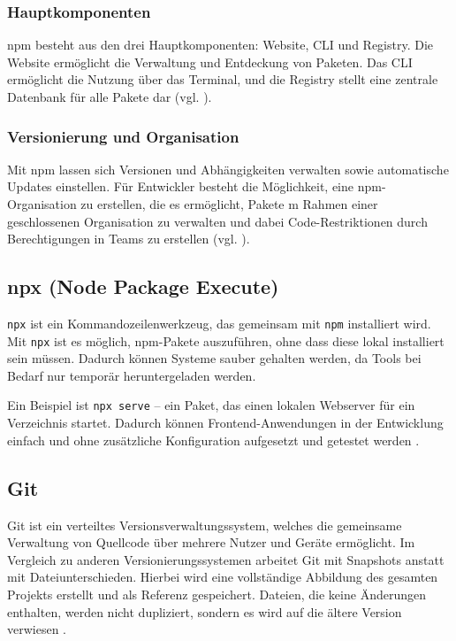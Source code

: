 \documentclass[oneside]{ausarbeitung}
\begin{document}
\subsubsection{Hauptkomponenten}
npm besteht aus den drei Hauptkomponenten: Website, CLI und Registry. Die Website ermöglicht die Verwaltung und Entdeckung von Paketen. Das CLI ermöglicht die Nutzung über das Terminal, und die Registry stellt eine zentrale Datenbank für alle Pakete dar (vgl. \parencite{npm}).

\subsubsection{Versionierung und Organisation}
Mit npm lassen sich Versionen und Abhängigkeiten verwalten sowie automatische Updates einstellen. Für Entwickler besteht die Möglichkeit, eine npm-Organisation zu erstellen, die es ermöglicht, Pakete m Rahmen einer geschlossenen Organisation zu verwalten und dabei Code-Restriktionen durch Berechtigungen in Teams zu erstellen (vgl. \parencite{npm}).

\subsection{npx (Node Package Execute)}

\texttt{npx} ist ein Kommandozeilenwerkzeug, das gemeinsam mit \texttt{npm} installiert wird. Mit \texttt{npx} ist es möglich, npm-Pakete auszuführen, ohne dass diese lokal installiert sein müssen. Dadurch können Systeme sauber gehalten werden, da Tools bei Bedarf nur temporär heruntergeladen werden.  

Ein Beispiel ist \texttt{npx serve} – ein Paket, das einen lokalen Webserver für ein Verzeichnis startet. Dadurch können Frontend-Anwendungen in der Entwicklung einfach und ohne zusätzliche Konfiguration aufgesetzt und getestet werden \parencite{npx-docs}.  

\subsection{Git}

Git ist ein verteiltes Versionsverwaltungssystem, welches die gemeinsame Verwaltung von Quellcode über mehrere Nutzer und Geräte ermöglicht. Im Vergleich zu anderen Versionierungssystemen arbeitet Git mit Snapshots anstatt mit Dateiunterschieden. Hierbei wird eine vollständige Abbildung des gesamten Projekts erstellt und als Referenz gespeichert. Dateien, die keine Änderungen enthalten, werden nicht dupliziert, sondern es wird auf die ältere Version verwiesen \parencite{git_intro}.
\end{document}
